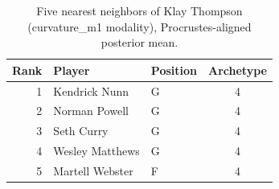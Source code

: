 \begin{table}[htbp]
  \centering\small
  \begin{tabular}{rllc}
    \toprule
    Rank & Player & Position & Archetype \\
    \midrule
    1 & Kendrick Nunn & G & 4 \\
    2 & Norman Powell & G & 4 \\
    3 & Seth Curry & G & 4 \\
    4 & Wesley Matthews & G & 4 \\
    5 & Martell Webster & F & 4 \\
    \bottomrule
  \end{tabular}
  \caption{Five nearest neighbors of Klay Thompson (curvature_m1 modality), Procrustes-aligned posterior mean.}
  \label{tab:Klay_Thompson_neighbors_curvature_m1}
\end{table}

